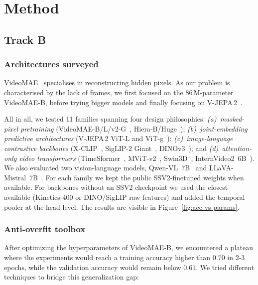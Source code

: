 \documentclass[10pt,twocolumn,letterpaper]{article}
\begin{document}
\section{Method}
\label{sec:method}

\subsection{Track B}

\subsubsection{Architectures surveyed}
\label{sec:method:archs}
VideoMAE~\cite{tong2022videomae} specialises in reconstructing
hidden pixels. As our problem is characterised by the lack of
frames, we first focused on the 86\,M-parameter VideoMAE-B, before
trying bigger models and finally focusing on
V-JEPA\,2~\cite{bardes2024vjepa2}.

All in all, we tested 11 families spanning four design philosophies:
\emph{(a)~masked-pixel pretraining} (VideoMAE-B/L/v2-G~\cite{tong2022videomae},
Hiera-B/Huge~\cite{ryali2023hiera}); \emph{(b)~joint-embedding predictive architectures}
(V-JEPA\,2 ViT-L and ViT-g~\cite{bardes2024vjepa2}); \emph{(c)~image-language contrastive
backbones} (X-CLIP~\cite{ni2022xclip}, SigLIP-2 Giant~\cite{tschannen2025siglip2},
DINOv3~\cite{oquab2023dinov2}); and \emph{(d)~attention-only video transformers}
(TimeSformer~\cite{bertasius2021timesformer}, MViT-v2~\cite{fan2021multiscale},
Swin3D~\cite{liu2022videoswin}, InternVideo2~6B~\cite{wang2024internvideo2}). We also
evaluated two vision-language models, Qwen-VL~7B~\cite{bai2023qwenvl} and
LLaVA-Mistral~7B~\cite{liu2023llava}. For each family we kept the public
SSV2-finetuned weights when available. For backbones without an SSV2 checkpoint we used
the closest available (Kinetics-400 or DINO/SigLIP raw features) and
added the temporal pooler at the head level. The results are visible in Figure~\ref{fig:acc-vs-params}.

\subsubsection{Anti-overfit toolbox}
\label{sec:method:overfit}
After optimizing the hyperparameters of VideoMAE-B, we encountered a plateau where the experiments would reach a training accuracy higher than $0.70$ in 2-3 epochs, while the validation accuracy would remain below $0.61$. We tried different techniques to bridge this generalization gap:
\end{document}
